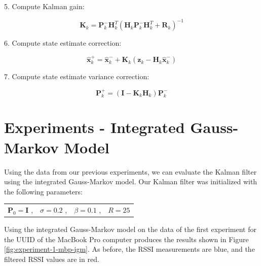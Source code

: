\documentclass[12pt]{article}
\begin{document}
5. Compute Kalman gain:

\begin{equation}
    \mathbf{K}_k = \mathbf{P}_k^- \mathbf{H}_k^T
        \left (
            \mathbf{H}_k \mathbf{P}_k^- \mathbf{H}_k^T + \mathbf{R}_k
        \right )^{-1}
    \label{eq:IGM-KF-gain}
\end{equation}

6. Compute state estimate correction:

\begin{equation}
    \hat{\mathbf{x}}_k^+ = \hat{\mathbf{x}}_k^- + \mathbf{K}_k
    \left (
        \mathbf{z}_k - \mathbf{H}_k \hat{\mathbf{x}}_k^-
    \right )
    \label{eq:IGM-KF-x-correction}
\end{equation}

7. Compute state estimate variance correction:

\begin{equation}
    \mathbf{P}_k^+ = \left ( \mathbf{I} - \mathbf{K}_k \mathbf{H}_k \right ) \mathbf{P}_k^-
    \label{eq:IGM-KF-P-correction}
\end{equation}



%
%

\clearpage
\section{Experiments - Integrated Gauss-Markov Model}

Using the data from our previous experiments, we can evaluate the Kalman filter using the
integrated Gauss-Markov model. Our Kalman filter was initialized with the following
parameters:

\begin{center}
    \begin{tabular}{cccc}
        $\mathbf{P}_0 = \mathbf{I}$ ,
        &
        $\sigma = 0.2$ ,
        &
        $\beta = 0.1$ ,
        &
        $R = 25$
    \end{tabular}
\end{center}

Using the integrated Gauss-Markov model on the data of the first experiment for
the UUID of the MacBook Pro computer produces the results shown in Figure
\ref{fig:experiment-1-mbp-igm}. As before, the RSSI measurements are blue, and the
filtered RSSI values are in red.
\end{document}
